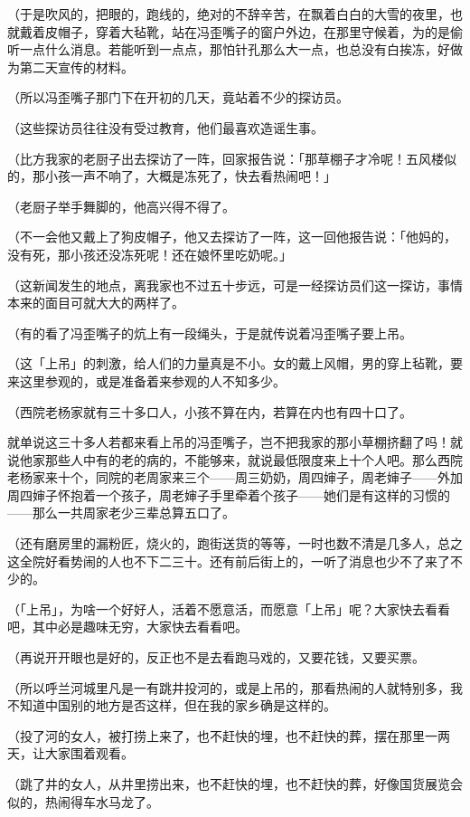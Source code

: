 \documentclass[UTF8]{ctexart}
\begin{document}
（于是吹风的，把眼的，跑线的，绝对的不辞辛苦，在飘着白白的大雪的夜里，也就戴着皮帽子，穿着大毡靴，站在冯歪嘴子的窗户外边，在那里守候着，为的是偷听一点什么消息。若能听到一点点，那怕针孔那么大一点，也总没有白挨冻，好做为第二天宣传的材料。

（所以冯歪嘴子那门下在开初的几天，竟站着不少的探访员。

（这些探访员往往没有受过教育，他们最喜欢造谣生事。

（比方我家的老厨子出去探访了一阵，回家报告说：「那草棚子才冷呢！五风楼似的，那小孩一声不响了，大概是冻死了，快去看热闹吧！」

（老厨子举手舞脚的，他高兴得不得了。

（不一会他又戴上了狗皮帽子，他又去探访了一阵，这一回他报告说：「他妈的，没有死，那小孩还没冻死呢！还在娘怀里吃奶呢。」

（这新闻发生的地点，离我家也不过五十步远，可是一经探访员们这一探访，事情本来的面目可就大大的两样了。

（有的看了冯歪嘴子的炕上有一段绳头，于是就传说着冯歪嘴子要上吊。

（这「上吊」的刺激，给人们的力量真是不小。女的戴上风帽，男的穿上毡靴，要来这里参观的，或是准备着来参观的人不知多少。

（西院老杨家就有三十多口人，小孩不算在内，若算在内也有四十口了。

就单说这三十多人若都来看上吊的冯歪嘴子，岂不把我家的那小草棚挤翻了吗！就说他家那些人中有的老的病的，不能够来，就说最低限度来上十个人吧。那么西院老杨家来十个，同院的老周家来三个——周三奶奶，周四婶子，周老婶子——外加周四婶子怀抱着一个孩子，周老婶子手里牵着个孩子——她们是有这样的习惯的——那么一共周家老少三辈总算五口了。

（还有磨房里的漏粉匠，烧火的，跑街送货的等等，一时也数不清是几多人，总之这全院好看势闹的人也不下二三十。还有前后街上的，一听了消息也少不了来了不少的。

（「上吊」，为啥一个好好人，活着不愿意活，而愿意「上吊」呢？大家快去看看吧，其中必是趣味无穷，大家快去看看吧。

（再说开开眼也是好的，反正也不是去看跑马戏的，又要花钱，又要买票。

（所以呼兰河城里凡是一有跳井投河的，或是上吊的，那看热闹的人就特别多，我不知道中国别的地方是否这样，但在我的家乡确是这样的。

（投了河的女人，被打捞上来了，也不赶快的埋，也不赶快的葬，摆在那里一两天，让大家围着观看。

（跳了井的女人，从井里捞出来，也不赶快的埋，也不赶快的葬，好像国货展览会似的，热闹得车水马龙了。
\end{document}
